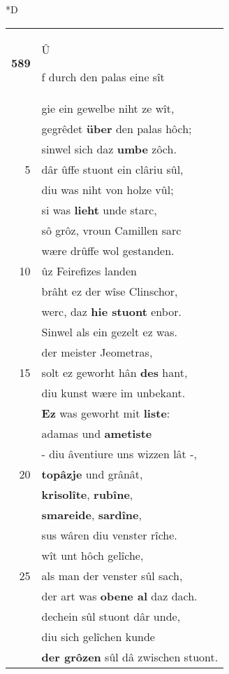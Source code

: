 \documentclass[8pt,a4paper,notitlepage]{article}
\begin{document}
\begin{table}[ht]
\begin{minipage}[t]{0.5\linewidth}
\small
\begin{center}*D
\end{center}
\begin{tabular}{rl}
\textbf{589} & \begin{large}Û\end{large}f durch den palas eine sît\\ 
 & gie ein gewelbe niht ze wît,\\ 
 & gegrêdet \textbf{über} den palas hôch;\\ 
 & sinwel sich daz \textbf{umbe} zôch.\\ 
5 & dâr ûffe stuont ein clâriu sûl,\\ 
 & diu was niht von holze vûl;\\ 
 & si was \textbf{lieht} unde starc,\\ 
 & sô grôz, vroun Camillen sarc\\ 
 & wære drûffe wol gestanden.\\ 
10 & ûz Feirefizes landen\\ 
 & brâht ez der wîse Clinschor,\\ 
 & werc, daz \textbf{hie stuont} enbor.\\ 
 & Sinwel als ein gezelt ez was.\\ 
 & der meister Jeometras,\\ 
15 & solt ez geworht hân \textbf{des} hant,\\ 
 & diu kunst wære im unbekant.\\ 
 & \textbf{Ez} was geworht mit \textbf{liste}:\\ 
 & adamas und \textbf{ametiste}\\ 
 & - diu âventiure uns wizzen lât -,\\ 
20 & \textbf{topâzje} und grânât,\\ 
 & \textbf{krisolîte}, \textbf{rubîne},\\ 
 & \textbf{smareide}, \textbf{sardîne},\\ 
 & sus wâren diu venster rîche.\\ 
 & wît unt hôch gelîche,\\ 
25 & als man der venster sûl sach,\\ 
 & der art was \textbf{obene al} daz dach.\\ 
 & dechein sûl stuont dâr unde,\\ 
 & diu sich gelîchen kunde\\ 
 & \textbf{der grôzen} sûl dâ zwischen stuont.\\ 

\end{tabular}
\end{minipage}
\end{table}
\end{document}
